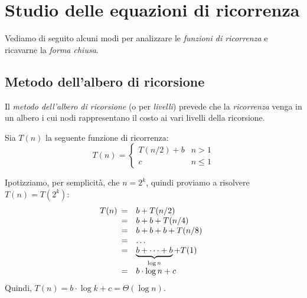 \section{Studio delle equazioni di ricorrenza}
Vediamo di seguito alcuni modi per analizzare le \emph{funzioni di ricorrenza}
e ricavarne la \emph{forma chiusa}.

\subsection{Metodo dell'albero di ricorsione}
Il \emph{metodo dell'albero di ricorsione} (o per \emph{livelli}) prevede che la
\emph{ricorrenza} venga  in un albero i cui nodi rappresentano il
costo ai vari livelli della ricorsione.

\begin{eg}
    Sia $T(n)$ la seguente funzione di ricorrenza:
    \[T(n)=\begin{cases}
        T(n/2)+b & n>1\\
        c & n\leq1
    \end{cases}\]

    \bigskip\noindent
    Ipotizziamo, per semplicità, che $n=2^k$, quindi proviamo a
    risolvere $T(n)=T(2^k)$:
    \[T(n)\begin{array}[t]{cl}
        = & b + T(n/2)\\
        = & b + b + T(n/4)\\
        = & b + b + b + T(n/8)\\
        = & \dots\\
        = & \underbrace{b + \dots + b}_{\log n} + T(1)\\
        = & b\cdot\log n + c
    \end{array}\]
    Quindi, $T(n)=b\cdot\log k + c=\Theta(\log n)$.
\end{eg}

